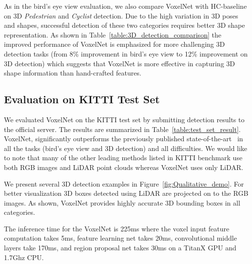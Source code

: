 \documentclass[10pt,twocolumn,letterpaper]{article}
\begin{document}
As in the bird's eye view evaluation, we also compare VoxelNet with HC-baseline on 3D \textit{Pedestrian} and \textit{Cyclist} detection. Due to the high variation in 3D poses and shapes, successful detection of these two categories requires better 3D shape representation. As shown in Table~\ref{table:3D_detection_comparison} the improved performance of VoxelNet is emphasized for more challenging 3D detection tasks (from 8\% improvement in bird's eye view to 12\% improvement on 3D detection) which suggests that VoxelNet is more effective in capturing 3D shape information than hand-crafted features.



\subsection{Evaluation on KITTI Test Set}

We evaluated VoxelNet on the KITTI test set by submitting detection results to the official server. The results are summarized in Table~\ref{table:test_set_result}. VoxelNet,  significantly outperforms the previously published state-of-the-art~\cite{REF:cvpr17chen}  in all the tasks (bird's eye view and 3D detection) and all difficulties. We would like to note that many of the other leading methods listed in KITTI benchmark  use both RGB images and LiDAR point clouds whereas VoxelNet  uses only LiDAR.






We present several 3D detection examples in Figure~\ref{fig:Qualitative_demo}. For better visualization  3D boxes detected using LiDAR are projected on to the RGB images. As shown, VoxelNet provides highly accurate 3D bounding boxes in all categories.



The inference time for the VoxelNet is 225ms where the voxel input feature computation takes 5ms, feature learning net takes 20ms, convolutional middle layers take 170ms, and region proposal net takes 30ms on a TitanX GPU and 1.7Ghz CPU.
\end{document}
